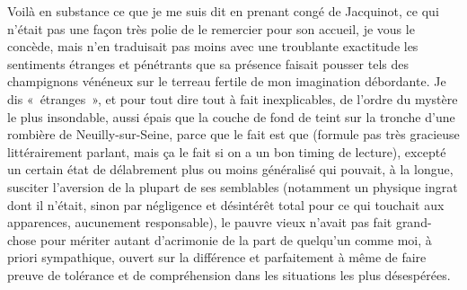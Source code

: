Voilà en substance ce que je me suis dit en prenant congé de Jacquinot, ce qui n’était pas une façon très polie de le remercier pour son accueil, je vous le concède, mais n’en traduisait pas moins avec une troublante exactitude les sentiments étranges et pénétrants que sa présence faisait pousser tels des champignons vénéneux sur le terreau fertile de mon imagination débordante. Je dis «~étranges~», et pour tout dire tout à fait inexplicables, de l’ordre du mystère le plus insondable, aussi épais que la couche de fond de teint sur la tronche d’une rombière de Neuilly-sur-Seine, parce que le fait est que (formule pas très gracieuse littérairement parlant, mais ça le fait si on a un bon timing de lecture), excepté un certain état de délabrement plus ou moins généralisé qui pouvait, à la longue, susciter l’aversion de la plupart de ses semblables (notamment un physique ingrat dont il n’était, sinon par négligence et désintérêt total pour ce qui touchait aux apparences, aucunement responsable), le pauvre vieux n’avait pas fait grand-chose pour mériter autant d’acrimonie de la part de quelqu’un comme moi, à priori sympathique, ouvert sur la différence et parfaitement à même de faire preuve de tolérance et de compréhension dans les situations les plus désespérées.

